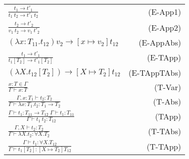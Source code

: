 \begin{minipage}{0.4\textwidth}
    \hspace{-10mm}
    \tabulinesep=2.2mm
    \begin{tabu}{l r}
        $\displaystyle \frac{t_1 \rightarrow t\prime_1}{t_1\:t_2 \rightarrow t\prime_1\:t_2}$ & (E-App1)\\
        $\displaystyle \frac{t_2 \rightarrow t\prime_2}{v_1\:t_2 \rightarrow v_1\:t\prime_2}$ &
        (E-App2) \\
        $\displaystyle (\lambda x:T_{11}.t_{12})v_2 \rightarrow [x \mapsto v_2] t_{12}$ & (E-AppAbs)
        \\
        $\displaystyle \frac{t_1 \rightarrow t\prime_1}{t_1[T_2] \rightarrow t\prime_1[T_2]}$ &
        (E-TApp) \\
        $\displaystyle (\lambda X.t_{12}[T_2]) \rightarrow [X \mapsto T_2] t_{12}$ & (E-TAppTAbs) \\
        $\displaystyle \frac{x:T \in \Gamma}{\Gamma \vdash x:T}$ & (T-Var) \\
        $\displaystyle \frac{\Gamma , x:T_1 \vdash t_2:T_2}{\Gamma \vdash \lambda x:T_1.t_2:T_1 \rightarrow T_2}$ & (T-Abs) \\
        $\displaystyle \frac{\Gamma \vdash t_1:T_{11}\rightarrow T_{12}\;\Gamma \vdash
        t_1:T_{11}}{\Gamma \vdash t_1\:t_2:T_{12}}$ & (TApp) \\
        $\displaystyle \frac{\Gamma , X \vdash t_2:T_2}{\Gamma \vdash \lambda X.t_2 : \forall X.T_2}$ & (T-TAbs) \\
        $\displaystyle \frac{\Gamma \vdash t_1: \forall X.T_{12}}{\Gamma \vdash t_1 [T_2]:[X \mapsto
        T_2]T_{12}}$ & (T-TApp) \\
    \end{tabu}
\end{minipage}
